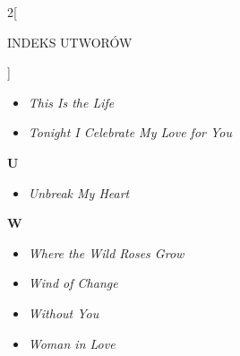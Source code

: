 \documentclass[a4paper]{report}
\begin{document}
\begin{multicols*}{2}[\begin{Huge}INDEKS UTWORÓW\end{Huge}\vspace{1cm}]
\begin{minipage}{\columnwidth}
	\begin{itemize}[topsep=6pt, after=\vspace{5mm}, leftmargin=0mm]
		\itemsep0em
		\item[]  \textit{This Is the Life}  \\
		\item[]  \textit{Tonight I Celebrate My Love for You}  \\
	\end{itemize}
\end{minipage}
\begin{minipage}{\columnwidth}
\begin{Large}
		\textbf{U}
	\end{Large} 
	\begin{itemize}[topsep=6pt, after=\vspace{5mm}, leftmargin=0mm]
		\itemsep0em
		\item[]\textit{Unbreak My Heart}  \\
	\end{itemize}
\end{minipage}
\begin{minipage}{\columnwidth}
\begin{Large}
		\textbf{W}
	\end{Large} 
	\begin{itemize}[topsep=6pt, after=\vspace{1.5mm}, leftmargin=0mm]
		\itemsep0em
		\item[]\textit{Where the Wild Roses Grow}  \\
		\item[]  \textit{Wind of Change}  \\
	\end{itemize}
\end{minipage}
\begin{minipage}{\columnwidth}
	\begin{itemize}[topsep=6pt, after=\vspace{5mm}, leftmargin=0mm]
		\itemsep0em
		\item[]  \textit{Without You}  \\
		\item[]  \textit{Woman in Love}  \\
	\end{itemize}
\end{minipage}



\end{multicols*}
\end{document}
